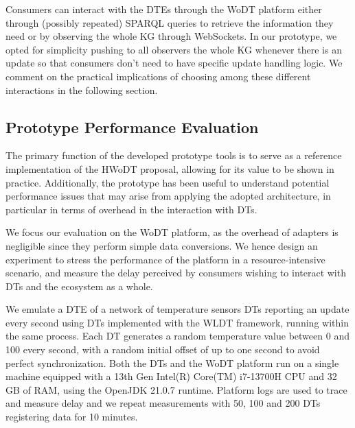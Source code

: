 Consumers can interact with the \acp{DTE} through the \ac{WoDT} platform
either through (possibly repeated) SPARQL queries to retrieve the information they need or by observing the whole \ac{KG} through WebSockets.
%
In our prototype, we opted for simplicity pushing to all observers the whole \ac{KG} whenever there is an update so that consumers don't need to have specific update handling logic. 
%
We comment on the practical implications of choosing among these different interactions in the following section. 


\subsection{Prototype Performance Evaluation}
\label{ssec:performance}


The primary function of the developed prototype tools is to serve as a reference implementation of the HWoDT proposal, allowing for its value to be shown in practice.
%
Additionally, the prototype has been useful to understand potential performance issues that may arise from applying the adopted architecture, in particular in terms of overhead in the interaction with \acp{DT}.

We focus our evaluation on the \ac{WoDT} platform, as the overhead of adapters is negligible since they perform simple data conversions.
%
We hence design an experiment to stress the performance of the platform in a resource-intensive scenario, and measure the delay perceived by consumers wishing to interact with \acp{DT} and the ecosystem as a whole.

We emulate a \ac{DTE} of a network of temperature sensors \acp{DT} reporting an update every second using \acp{DT} implemented with the \ac{WLDT} framework, running within the same process.
%
Each \ac{DT} generates a random temperature value between 0 and 100 every second, with a random initial offset of up to one second to avoid perfect synchronization.
%
Both the \acp{DT} and the \ac{WoDT} platform run on a single machine equipped with a 13th Gen Intel(R) Core(TM) i7-13700H CPU and 32 GB of RAM, using the OpenJDK 21.0.7 runtime. Platform logs are used to trace and measure delay and we repeat measurements with 50, 100 and 200 \acp{DT} registering data for 10 minutes.

